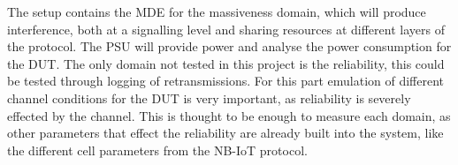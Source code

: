 The setup contains the MDE for the massiveness domain, which will produce interference, both at a signalling level and sharing resources at different layers of the protocol. The PSU will provide power and analyse the power consumption for the DUT. The only domain not tested in this project is the reliability, this could be tested through logging of retransmissions. For this part emulation of different channel conditions for the DUT is very important, as reliability is severely effected by the channel. This is thought to be enough to measure each domain, as other parameters that effect the reliability are already built into the system, like the different cell parameters from the NB-IoT protocol.

